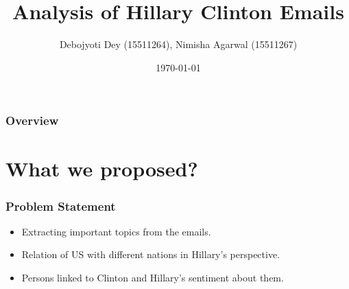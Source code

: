 \documentclass{beamer}
\title[Short title]{Analysis of Hillary Clinton Emails} %
\author{Debojyoti Dey (15511264), Nimisha Agarwal (15511267)} %
\date{\today} %
\begin{document}
	
\begin{frame}
	\titlepage %
\end{frame}

\begin{frame}
	\frametitle{Overview} %
	\tableofcontents %
\end{frame}


\section{What we proposed?}


\begin{frame}
	\frametitle{Problem Statement}
	\begin{itemize}
		\item Extracting important topics from the emails.
		\item Relation of US with different nations in Hillary's perspective.
		\item Persons linked to Clinton and Hillary's sentiment about them.
	\end{itemize}
\end{frame}

\end{document}
